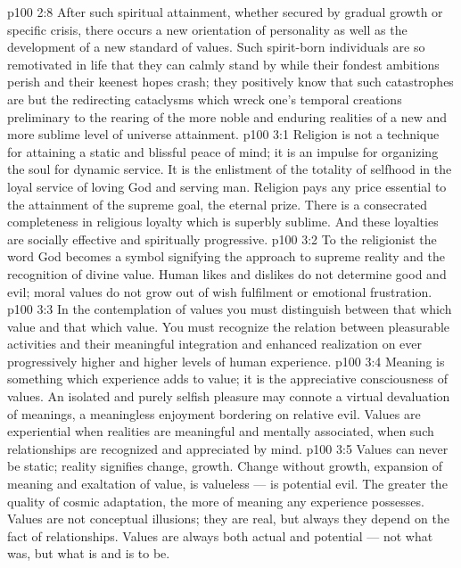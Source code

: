 \vs p100 2:8 After such spiritual attainment, whether secured by gradual growth or specific crisis, there occurs a new orientation of personality as well as the development of a new standard of values. Such spirit\hyp{}born individuals are so remotivated in life that they can calmly stand by while their fondest ambitions perish and their keenest hopes crash; they positively know that such catastrophes are but the redirecting cataclysms which wreck one’s temporal creations preliminary to the rearing of the more noble and enduring realities of a new and more sublime level of universe attainment.
\vs p100 3:1 Religion is not a technique for attaining a static and blissful peace of mind; it is an impulse for organizing the soul for dynamic service. It is the enlistment of the totality of selfhood in the loyal service of loving God and serving man. Religion pays any price essential to the attainment of the supreme goal, the eternal prize. There is a consecrated completeness in religious loyalty which is superbly sublime. And these loyalties are socially effective and spiritually progressive.
\vs p100 3:2 To the religionist the word God becomes a symbol signifying the approach to supreme reality and the recognition of divine value. Human likes and dislikes do not determine good and evil; moral values do not grow out of wish fulfilment or emotional frustration.
\vs p100 3:3 In the contemplation of values you must distinguish between that which  value and that which  value. You must recognize the relation between pleasurable activities and their meaningful integration and enhanced realization on ever progressively higher and higher levels of human experience.
\vs p100 3:4 \pc Meaning is something which experience adds to value; it is the appreciative consciousness of values. An isolated and purely selfish pleasure may connote a virtual devaluation of meanings, a meaningless enjoyment bordering on relative evil. Values are experiential when realities are meaningful and mentally associated, when such relationships are recognized and appreciated by mind.
\vs p100 3:5 \pc Values can never be static; reality signifies change, growth. Change without growth, expansion of meaning and exaltation of value, is valueless --- is potential evil. The greater the quality of cosmic adaptation, the more of meaning any experience possesses. Values are not conceptual illusions; they are real, but always they depend on the fact of relationships. Values are always both actual and potential --- not what was, but what is and is to be.
